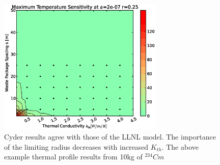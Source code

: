 \begin{figure}[htbp!]
\begin{center}
\includegraphics[width=0.7\textwidth]{./chapters/demonstration/conductivity/ks.eps}
\end{center}
\caption[$K_{th}$ vs. Waste Package Spacing Sensitivity in Cyder]{Cyder results agree with 
those of the LLNL model. The importance of the limiting radius decreases with 
increased $K_{th}$. The above example thermal profile results from 10kg of 
$^{234}Cm$}
\label{fig:Cm242Kth_alpha_high}
\end{figure}


